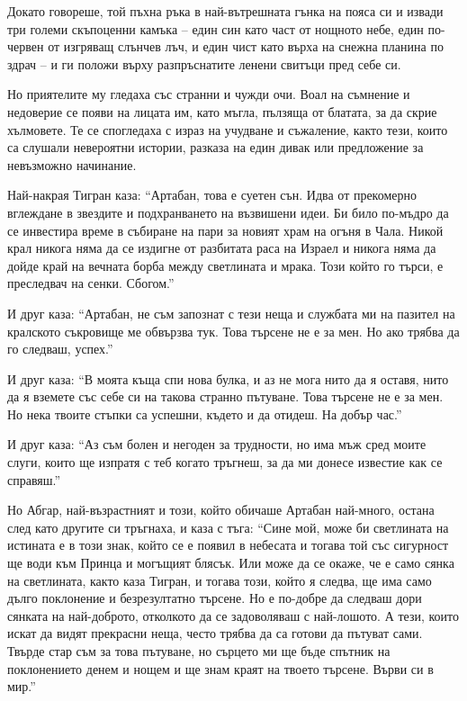 \documentclass[oneside,10pt]{memoir}
\begin{document}
Докато говореше, той пъхна ръка в най-вътрешната гънка на пояса си и извади три
големи скъпоценни камъка -- един син като част от нощното небе, един по-червен
от изгряващ слънчев лъч, и един чист като върха на снежна планина по здрач -- и
ги положи върху разпръснатите ленени свитъци пред себе си.

Но приятелите му гледаха със странни и чужди очи. Воал на съмнение и недоверие
се появи на лицата им, като мъгла, пълзяща от блатата, за да скрие хълмовете. Те
се спогледаха с израз на учудване и съжаление, както тези, които са слушали
невероятни истории, разказа на един дивак или предложение за невъзможно
начинание.

Най-накрая Тигран каза: ``Артабан, това е суетен сън. Идва от прекомерно
вглеждане в звездите и подхранването на възвишени идеи. Би било по-мъдро да се
инвестира време в събиране на пари за новият храм на огъня в Чала. Никой крал
никога няма да се издигне от разбитата раса на Израел и никога няма да дойде
край на вечната борба между светлината и мрака. Този който го търси, е
преследвач на сенки. Сбогом.''

И друг каза: ``Артабан, не съм запознат с тези неща и службата ми на пазител на
кралското съкровище ме обвързва тук. Това търсене не е за мен. Но ако трябва да
го следваш, успех.''

И друг каза: ``В моята къща спи нова булка, и аз не мога нито да я оставя, нито
да я вземете със себе си на такова странно пътуване. Това търсене не е за мен.
Но нека твоите стъпки са успешни, където и да отидеш. На добър час.''

И друг каза: ``Аз съм болен и негоден за трудности, но има мъж сред моите слуги,
които ще изпратя с теб когато тръгнеш, за да ми донесе известие как се
справяш.''

Но Абгар, най-възрастният и този, който обичаше Артабан най-много, остана след
като другите си тръгнаха, и каза с тъга: ``Сине мой, може би светлината на
истината е в този знак, който се е появил в небесата и тогава той със сигурност
ще води към Принца и могъщият блясък. Или може да се окаже, че е само сянка на
светлината, както каза Тигран, и тогава този, който я следва, ще има само дълго
поклонение и безрезултатно търсене. Но е по-добре да следваш дори сянката на
най-доброто, отколкото да се задоволяваш с най-лошото. А тези, които искат да
видят прекрасни неща, често трябва да са готови да пътуват сами. Твърде стар съм
за това пътуване, но сърцето ми ще бъде спътник на поклонението денем и нощем и
ще знам краят на твоето търсене. Върви си в мир.''
\end{document}
